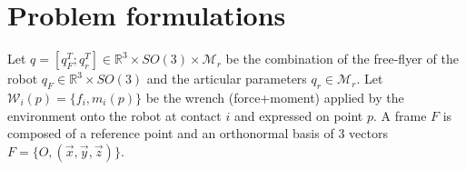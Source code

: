 
\section{Problem formulations}
\label{sec:problem_formulations}

Let $q=[q_F^T; q_r^T]\in\mathbb{R}^3\times SO(3)\times \mathcal{M}_r$ be the combination of the free-flyer of the robot $q_F\in \mathbb{R}^3 \times SO(3)$ and the articular parameters $q_r\in\mathcal{M}_r$.
Let $\mathcal{W}_i(p)=\{f_i,m_i(p)\}$ be the wrench (force+moment) applied by the environment onto the robot at contact $i$ and expressed on point $p$.
A frame $F$ is composed of a reference point and an orthonormal basis of 3 vectors $F = \{O, (\vec{x}, \vec{y}, \vec{z})\}$.


